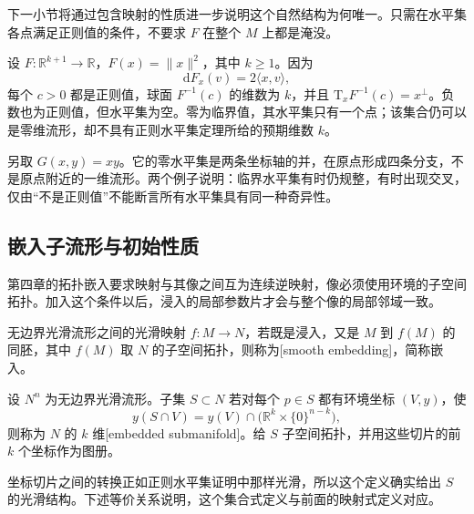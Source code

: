 下一小节将通过包含映射的性质进一步说明这个自然结构为何唯一。只需在水平集各点满足正则值的条件，不要求 \(F\) 在整个 \(M\) 上都是淹没。

\begin{example}\label{g1:exm:regular-sphere-and-singular-level}
	设 \(F:\mathbb R^{k+1}\to\mathbb R\)，\(F(x)=\|x\|^2\)，其中 \(k\ge1\)。因为
	\[
		\mathrm{d}F_x(v)=2\langle x,v\rangle,
	\]
	每个 \(c>0\) 都是正则值，球面 \(F^{-1}(c)\) 的维数为 \(k\)，并且 \(\mathrm{T}_xF^{-1}(c)=x^\perp\)。负数也为正则值，但水平集为空。零为临界值，其水平集只有一个点；该集合仍可以是零维流形，却不具有正则水平集定理所给的预期维数 \(k\)。

	另取 \(G(x,y)=xy\)。它的零水平集是两条坐标轴的并，在原点形成四条分支，不是原点附近的一维流形。两个例子说明：临界水平集有时仍规整，有时出现交叉，仅由“不是正则值”不能断言所有水平集具有同一种奇异性。
\end{example}

\subsection{嵌入子流形与初始性质}
\label{g1:subsec:1104:03}

第四章的拓扑嵌入要求映射与其像之间互为连续逆映射，像必须使用环境的子空间拓扑。加入这个条件以后，浸入的局部参数片才会与整个像的局部邻域一致。

\begin{definition}\label{g1:def:smooth-embedding}
	无边界光滑流形之间的光滑映射 \(f:M\to N\)，若既是浸入，又是 \(M\) 到 \(f(M)\) 的同胚，其中 \(f(M)\) 取 \(N\) 的子空间拓扑，则称为[smooth embedding]，简称嵌入。
\end{definition}

\begin{definition}\label{g1:def:embedded-submanifold}
	设 \(N^n\) 为无边界光滑流形。子集 \(S\subset N\) 若对每个 \(p\in S\) 都有环境坐标 \((V,y)\)，使
	\[
		y(S\cap V)=y(V)\cap\bigl(\mathbb R^k\times\{0\}^{n-k}\bigr),
	\]
	则称为 \(N\) 的 \(k\) 维[embedded submanifold]。给 \(S\) 子空间拓扑，并用这些切片的前 \(k\) 个坐标作为图册。
\end{definition}

坐标切片之间的转换正如正则水平集证明中那样光滑，所以这个定义确实给出 \(S\) 的光滑结构。下述等价关系说明，这个集合式定义与前面的映射式定义对应。

